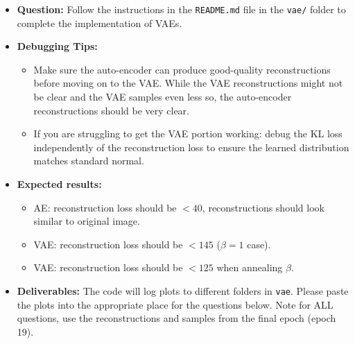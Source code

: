 \documentclass[11pt,addpoints,answers]{exam}
\numberwithin{equation}{section} %
\numberwithin{figure}{section} %
\numberwithin{table}{section} %
\begin{document}
\begin{itemize}
\item \textbf{Question:} Follow the instructions in the \texttt{README.md} file in the \texttt{vae/} folder to complete the implementation of VAEs.
\item \textbf{Debugging Tips:}
    \begin{itemize}
        \item Make sure the auto-encoder can produce good-quality reconstructions before moving on to the VAE. 
        While the VAE reconstructions might not be clear and the VAE samples even less so, the auto-encoder reconstructions should be very clear.
        \item If you are struggling to get the VAE portion working: debug the KL loss independently of the reconstruction loss to ensure the learned distribution matches standard normal. 
    \end{itemize}
\item \textbf{Expected results:}
    \begin{itemize}
        \item AE: reconstruction loss should be $<40$, reconstructions should look similar to original image.
        \item VAE: reconstruction loss should be $< 145$ ($\beta=1$ case).
        \item VAE: reconstruction loss should be $< 125$ when annealing $\beta$.
    \end{itemize}
\item \textbf{Deliverables:} The code will log plots to different folders in \texttt{vae}. Please paste the plots into the appropriate place for the questions below. Note for ALL questions, use the reconstructions and samples from the final epoch (epoch 19). 
\end{itemize}
\newpage
\end{document}
